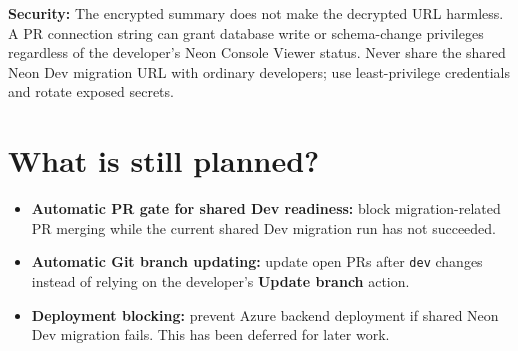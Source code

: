 \documentclass[10pt,a4paper]{article}
\begin{document}
\textbf{Security:} The encrypted summary does not make the decrypted URL harmless. A PR connection string can grant database write or schema-change privileges regardless of the developer's Neon Console Viewer status. Never share the shared Neon Dev migration URL with ordinary developers; use least-privilege credentials and rotate exposed secrets.

\section*{What is still planned?}
\begin{itemize}
  \item \textbf{Automatic PR gate for shared Dev readiness:} block migration-related PR merging while the current shared Dev migration run has not succeeded.
  \item \textbf{Automatic Git branch updating:} update open PRs after \texttt{dev} changes instead of relying on the developer's \textbf{Update branch} action.
  \item \textbf{Deployment blocking:} prevent Azure backend deployment if shared Neon Dev migration fails. This has been deferred for later work.
\end{itemize}
\end{document}
